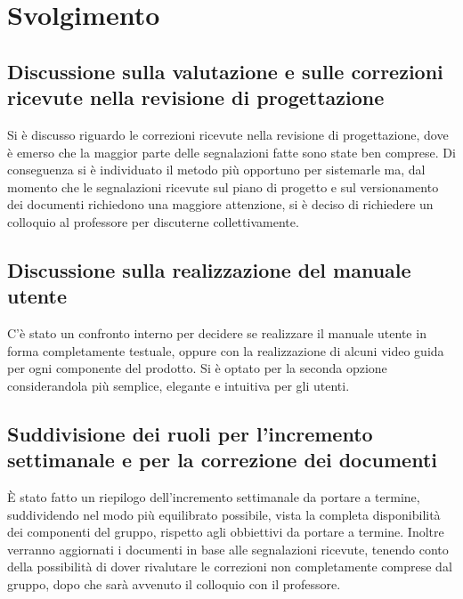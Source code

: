 \newpage
\section*{Svolgimento}

	\subsection*{Discussione sulla valutazione e sulle correzioni ricevute nella revisione di progettazione}
		Si è discusso riguardo le correzioni ricevute nella revisione di progettazione, dove è emerso che la maggior parte delle segnalazioni fatte sono state ben comprese. Di conseguenza si è individuato il metodo più opportuno per sistemarle ma, dal momento che le segnalazioni ricevute sul piano di progetto e sul versionamento dei documenti richiedono una maggiore attenzione, si è deciso di richiedere un colloquio al professore per discuterne collettivamente. 

	\subsection*{Discussione sulla realizzazione del manuale utente}
		C'è stato un confronto interno per decidere se realizzare il manuale utente in forma completamente testuale, oppure con la realizzazione di alcuni video guida per ogni componente del prodotto. Si è optato per la seconda opzione considerandola più semplice, elegante e intuitiva per gli utenti. 
		
	\subsection*{Suddivisione dei ruoli per l'incremento settimanale e per la correzione dei documenti}
		È stato fatto un riepilogo dell'incremento settimanale da portare a termine, suddividendo nel modo più equilibrato possibile, vista la completa disponibilità dei componenti del gruppo, rispetto agli obbiettivi da portare a termine. Inoltre verranno aggiornati i documenti in base alle segnalazioni ricevute, tenendo conto della possibilità di dover rivalutare le correzioni non completamente comprese dal gruppo, dopo che sarà avvenuto il colloquio con il professore.
		